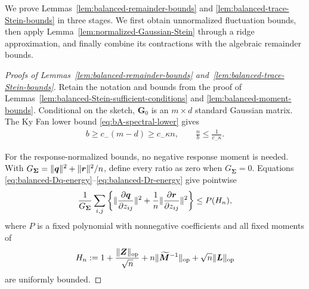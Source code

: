 \documentclass{article}
\theoremstyle{plain}
\theoremstyle{definition}
\theoremstyle{definition}
\DeclarePairedDelimiter\norm{\lVert}{\rVert}
\def\mathbold{\boldsymbol}
\def\cal{\mathcal}
\def\bG{\mathbold{G}}\def\calG{{\cal G}}\def\scrG{{\mathscr G}}\def\Ghat{\widehat{G}}\def\Gtil{{\widetilde G}}
\def\bL{\mathbold{L}}\def\hbL{{\widehat{\bL}}}\def\tbL{{\widetilde{\bL}}}
\def\bM{\mathbold{M}}\def\hbM{{\widehat{\bM}}}\def\tbM{{\widetilde{\bM}}}
\def\bq{\mathbold{q}}\def\qhat{\widehat{q}}\def\qtil{\widetilde{q}}\def\qbar{{\overline q}}
\def\br{\mathbold{r}}\def\rhat{\widehat{r}}\def\rtil{\widetilde{r}}\def\rbar{{\overline r}}
\def\bZ{\mathbold{Z}}\def\hbZ{{\widehat{\bZ}}}\def\tbZ{{\widetilde{\bZ}}}
\def\bSigma{\mathbold{\Sigma}}\def\hbSigma{{\widehat{\bSigma}}}
\begin{document}
We prove Lemmas~\ref{lem:balanced-remainder-bounds} and
\ref{lem:balanced-trace-Stein-bounds} in three stages. We first obtain
unnormalized fluctuation bounds, then apply
Lemma~\ref{lem:normalized-Gaussian-Stein} through a ridge approximation,
and finally combine its contractions with the algebraic remainder bounds.

\begin{proof}[Proofs of Lemmas~\ref{lem:balanced-remainder-bounds}
and~\ref{lem:balanced-trace-Stein-bounds}]
Retain the notation and bounds from the proof of
Lemmas~\ref{lem:balanced-Stein-sufficient-conditions} and
\ref{lem:balanced-moment-bounds}.
Conditional on the sketch, $\bG_0$ is an $m\times d$ standard Gaussian
matrix.  The Ky Fan lower bound \eqref{eq:bA-spectral-lower} gives
\begin{align}
    b\geq c_-(m-d)\geq c_-\kappa n,
    \qquad \frac{n}{b}\leq\frac{1}{c_-\kappa}.
    \label{eq:balanced-b-lower}
\end{align}

For the response-normalized bounds, no negative response moment is needed.
With
$G_{\bSigma}=\norm{\bq}^2+\norm{\br}^2/n$, define every ratio as zero when
$G_{\bSigma}=0$.  Equations
\eqref{eq:balanced-Dq-energy}--\eqref{eq:balanced-Dr-energy} give pointwise
\begin{align}
    \frac{1}{G_{\bSigma}}
    \sum_{i,j}\left\{
       \norm{\pdv{\bq}{z_{ij}}}^2
       +\frac1n\norm{\pdv{\br}{z_{ij}}}^2
    \right\}
    \leq P(H_n),
    \label{eq:balanced-normalized-energy}
\end{align}
where $P$ is a fixed polynomial with nonnegative coefficients and
all fixed moments of
\begin{align*}
    H_n:=1+\frac{\norm{\bZ}_{\rm op}}{\sqrt n}
       +n\norm{\widetilde{\bM}^{-1}}_{\rm op}
       +\sqrt n\norm{\bL}_{\rm op}
\end{align*}
are uniformly bounded.


\end{proof}
\end{document}
